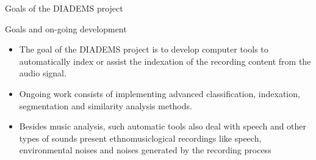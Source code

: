 \documentclass[final, hyperref, table]{beamer}
\begin{document}
\begin{frame}{Goals of the DIADEMS project}
 \begin{block}{Goals and on-going development}
    \begin{itemize}
    \item The goal of the DIADEMS project is to develop computer tools
      to \alert{automatically index} or assist the indexation of the recording content from the audio signal.
    \item  Ongoing work consists of implementing
    advanced \alert{classification, indexation, segmentation and similarity
    analysis} methods.
  \item \alert{Besides music analysis}, such automatic tools also deal with speech
    and other types of sounds present ethnomusiclogical recordings like  \alert{speech, environmental noises and noises generated by the recording process}
    \end{itemize}

   
  \end{block}
\end{frame}
\end{document}
